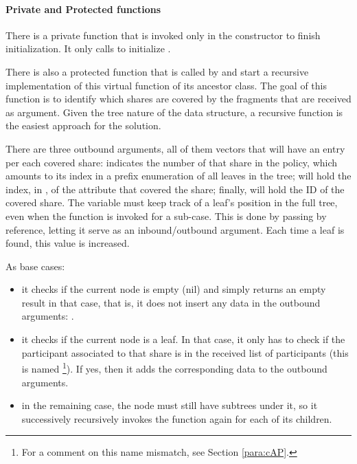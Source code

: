 \documentclass{article}
\begin{document}
\paragraph{Private and Protected functions}

There is a private function  that is invoked only in the constructor to finish initialization. It only calls  to initialize . 

There is also a protected function  that is called by   and start a recursive implementation of this virtual function of its ancestor class. The goal of this function is to identify which shares are covered by the fragments that are received as argument. Given the tree nature of the data structure, a recursive function is the easiest approach for the solution. 

There are three outbound arguments, all of them vectors that will have an entry per each covered share:  indicates the number of that share in the policy, which amounts to its index in a prefix enumeration of all leaves in the tree;  will hold the index, in , of the attribute that covered the share; finally,  will hold the ID of the covered share. The variable  must keep track of a leaf's position in the full tree, even when the function is invoked for a sub-case. This is done by passing  by reference, letting it serve as an inbound/outbound argument. Each time a leaf is found, this value is increased.

As base cases:
\begin{itemize}
\item it checks if the current node is empty (nil) and simply returns an empty result in that case, that is, it does not insert any data in the outbound arguments: . 
\item it checks if the current node is a leaf. In that case, it only has to check if the participant associated to that share is in the received list of participants (this is named \footnote{For a comment on this name mismatch, see Section \ref{para:cAP}.}). If yes, then it adds the corresponding data to the outbound arguments.
\item in the remaining case, the node must still have subtrees under it, so it successively recursively invokes the function again for each of its children. 
\end{itemize} 
\end{document}
